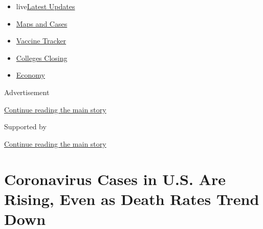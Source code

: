 \begin{itemize}
\tightlist
\item
  live\href{https://www.nytimes3xbfgragh.onion/2020/08/21/world/covid-19-coronavirus.html?name=styln-coronavirus-national\&region=TOP_BANNER\&variant=undefined\&block=storyline_menu_recirc\&action=click\&pgtype=Article\&impression_id=4a62ac61-e39e-11ea-9e73-bd3f3155e7f4}{Latest
  Updates}
\item
  \href{https://www.nytimes3xbfgragh.onion/interactive/2020/us/coronavirus-us-cases.html?name=styln-coronavirus-national\&region=TOP_BANNER\&variant=undefined\&block=storyline_menu_recirc\&action=click\&pgtype=Article\&impression_id=4a62d370-e39e-11ea-9e73-bd3f3155e7f4}{Maps
  and Cases}
\item
  \href{https://www.nytimes3xbfgragh.onion/interactive/2020/science/coronavirus-vaccine-tracker.html?name=styln-coronavirus-national\&region=TOP_BANNER\&variant=undefined\&block=storyline_menu_recirc\&action=click\&pgtype=Article\&impression_id=4a62d371-e39e-11ea-9e73-bd3f3155e7f4}{Vaccine
  Tracker}
\item
  \href{https://www.nytimes3xbfgragh.onion/2020/08/19/us/colleges-closing-covid.html?name=styln-coronavirus-national\&region=TOP_BANNER\&variant=undefined\&block=storyline_menu_recirc\&action=click\&pgtype=Article\&impression_id=4a62d372-e39e-11ea-9e73-bd3f3155e7f4}{Colleges
  Closing}
\item
  \href{https://www.nytimes3xbfgragh.onion/live/2020/08/20/business/stock-market-today-coronavirus?name=styln-coronavirus-national\&region=TOP_BANNER\&variant=undefined\&block=storyline_menu_recirc\&action=click\&pgtype=Article\&impression_id=4a62d373-e39e-11ea-9e73-bd3f3155e7f4}{Economy}
\end{itemize}

Advertisement

\protect\hyperlink{after-top}{Continue reading the main story}

Supported by

\protect\hyperlink{after-sponsor}{Continue reading the main story}

\hypertarget{coronavirus-cases-in-us-are-rising-even-as-death-rates-trend-down}{%
\section{Coronavirus Cases in U.S. Are Rising, Even as Death Rates Trend
Down}\label{coronavirus-cases-in-us-are-rising-even-as-death-rates-trend-down}}

